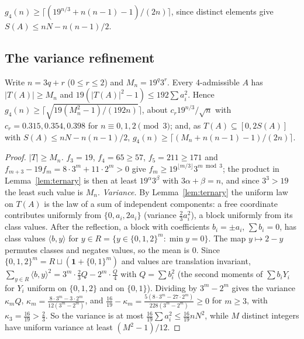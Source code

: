 \begin{corollary}\label{cor:clankers}
$g_4(n)\ge\lceil(19^{n/3}+n(n-1)-1)/(2n)\rceil$, since distinct elements give $S(A)\le nN-n(n-1)/2$.
\end{corollary}

\subsection{The variance refinement}

\begin{theorem}[EP-03]\label{thm:variance}
Write $n=3q+r$ ($0\le r\le2$) and $M_n=19^q3^r$. Every 4-admissible $A$ has $|T(A)|\ge M_n$ and $19(|T(A)|^2-1)\le192\sum a_i^2$. Hence $g_4(n)\ge\lceil\sqrt{19(M_n^2-1)/(192n)}\rceil$, about $c_r19^{n/3}/\sqrt n$ with $c_r=0.315,0.354,0.398$ for $n\equiv0,1,2\pmod3$; and, as $T(A)\subseteq[0,2S(A)]$ with $S(A)\le nN-n(n-1)/2$, $g_4(n)\ge\lceil(M_n+n(n-1)-1)/(2n)\rceil$.
\end{theorem}
\begin{proof}
\emph{$|T|\ge M_n$.} $f_3=19$, $f_4=65\ge57$, $f_5=211\ge171$ and $f_{m+3}-19f_m=8\cdot3^m+11\cdot2^m>0$ give $f_m\ge19^{\lfloor m/3\rfloor}3^{m\bmod3}$; the product in Lemma~\ref{lem:ternary} is then at least $19^\alpha3^\beta$ with $3\alpha+\beta=n$, and since $3^3>19$ the least such value is $M_n$.
\emph{Variance.} By Lemma~\ref{lem:ternary} the uniform law on $T(A)$ is the law of a sum of independent components: a free coordinate contributes uniformly from $\{0,a_i,2a_i\}$ (variance $\frac23a_i^2$), a block uniformly from its class values. After the reflection, a block with coefficients $b_i=\pm a_i$, $\sum b_i=0$, has class values $\langle b,y\rangle$ for $y\in R=\{y\in\{0,1,2\}^m:\min y=0\}$. The map $y\mapsto2-y$ permutes classes and negates values, so the mean is $0$. Since $\{0,1,2\}^m=R\sqcup(\mathbf1+\{0,1\}^m)$ and values are translation invariant, $\sum_{y\in R}\langle b,y\rangle^2=3^m\cdot\frac23Q-2^m\cdot\frac Q4$ with $Q=\sum b_i^2$ (the second moments of $\sum b_iY_i$ for $Y_i$ uniform on $\{0,1,2\}$ and on $\{0,1\}$). Dividing by $3^m-2^m$ gives the variance $\kappa_mQ$, $\kappa_m=\frac{8\cdot3^m-3\cdot2^m}{12(3^m-2^m)}$, and $\frac{16}{19}-\kappa_m=\frac{5(8\cdot3^m-27\cdot2^m)}{228(3^m-2^m)}\ge0$ for $m\ge3$, with $\kappa_3=\frac{16}{19}>\frac23$. So the variance is at most $\frac{16}{19}\sum a_i^2\le\frac{16}{19}nN^2$, while $M$ distinct integers have uniform variance at least $(M^2-1)/12$.
\end{proof}

